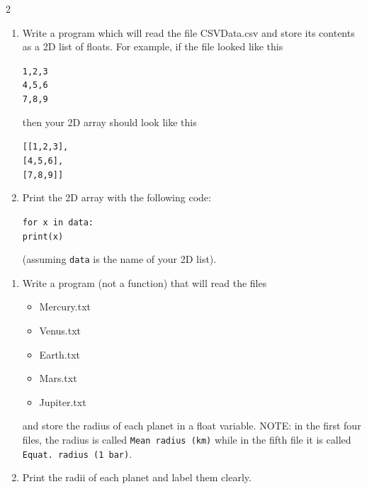 \documentclass[12pt]{article}%
\newcommand{\code}[1]{\texttt{#1}}
\newcommand{\tab}{\hspace*{45pt}}
\begin{document}
\begin{multicols*}{2}

\begin{Exercise}[origin={10 points, Python}]

\begin{enumerate}[leftmargin=*]
\item Write a program which will read the file CSVData.csv and store its contents as a 2D list of floats. For example, if the file looked like this

\code{1,2,3\\ %
4,5,6\\ %
7,8,9
}

then your 2D array should look like this

\code{[[1,2,3],\\ \hspace{0pt}
[4,5,6],\\ \hspace{0pt}
[7,8,9]]
}
\item Print the 2D array with the following code:

\code{for x in data: \\
\tab print(x)
}

(assuming \code{data} is the name of your 2D list).
\end{enumerate}

\end{Exercise}

\begin{Exercise}[origin={10 points, Python}]

\begin{enumerate}[leftmargin=*]
\item Write a program (not a function) that will read the files
\begin{itemize}
	\setlength\itemsep{0pt}
	\item Mercury.txt
	\item Venus.txt
	\item Earth.txt
	\item Mars.txt
	\item Jupiter.txt
\end{itemize}
and store the radius of each planet in a float variable. NOTE: in the first four files, the radius is called \code{Mean radius (km)} while in the fifth file it is called \code{Equat. radius (1 bar)}.
\item Print the radii of each planet and label them clearly.
\end{enumerate}


\end{Exercise}
\end{multicols*}
\end{document}
